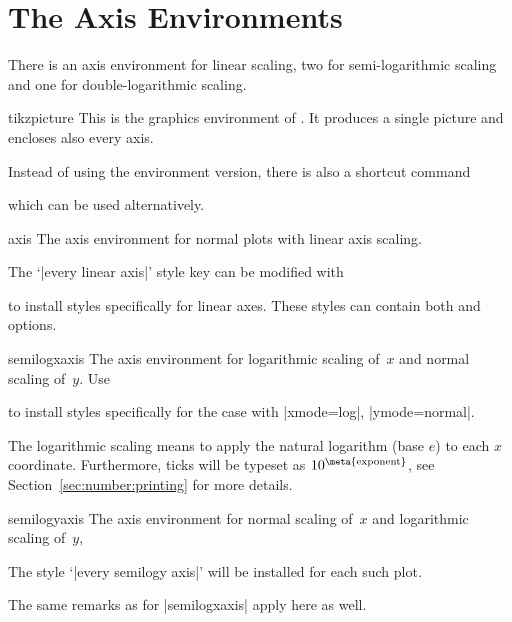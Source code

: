 
\section{The Axis Environments}

There is an axis environment for linear scaling, two for semi-logarithmic
scaling and one for double-logarithmic scaling.
%
\begin{environment}{{tikzpicture}}
    This is the graphics environment of \Tikz{}. It produces a single picture
    and encloses also every axis.

    Instead of using the environment version, there is also a shortcut command

    \declareandlabel{\tikz}

    which can be used alternatively.
\end{environment}

\begin{environment}{{axis}}
    The axis environment for normal plots with linear axis scaling.

    The `|every linear axis|' style key can be modified with
\begin{codeexample}
\end{codeexample}
    to install styles specifically for linear axes. These styles can contain
    both \Tikz{} and \PGFPlots{} options.
\end{environment}

\begin{environment}{{semilogxaxis}}
    The axis environment for logarithmic scaling of~$x$ and normal scaling
    of~$y$. Use
\begin{codeexample}
\end{codeexample}
    to install styles specifically for the case with |xmode=log|, |ymode=normal|.

    The logarithmic scaling means to apply the natural logarithm (base $e$) to
    each $x$ coordinate. Furthermore, ticks will be typeset as
    $10^{\text{\meta{exponent}}}$, see Section~\ref{sec:number:printing} for
    more details.
\end{environment}

\begin{environment}{{semilogyaxis}}
    The axis environment for normal scaling of~$x$ and logarithmic scaling
    of~$y$,

    The style `|every semilogy axis|' will be installed for each such plot.

    The same remarks as for |semilogxaxis| apply here as well.
\end{environment}

